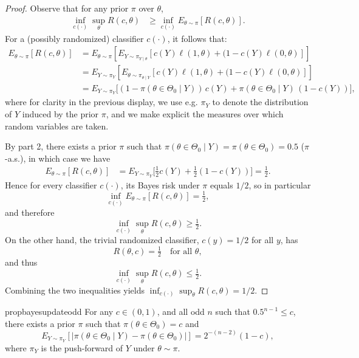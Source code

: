\documentclass[12pt,reqno]{amsart}
\begin{document}
\trivialclassification*
\begin{proof}
Observe that for any prior $\pi$ over $\theta$,
\begin{align*}
 \inf_{c(\cdot)} \sup_{\theta} R(c,\theta)
 &\geq \inf_{c(\cdot)} E_{\theta \sim \pi}[ R(c,\theta)] .
\end{align*}
For a (possibly randomized) classifier $c(\cdot)$, it follows that:
\begin{align*}
E_{\theta \sim \pi}[R(c,\theta)] & = E_{\theta \sim \pi}[ E_{Y \sim \pi_{Y \mid \theta}}[c(Y)\ell(1,\theta) + (1-c(Y) \ell(0,\theta)] ] \\
&= E_{Y \sim \pi_Y}[ E_{\theta \sim \pi_{\theta \mid Y}}[c(Y)\ell(1,\theta) + (1-c(Y) \ell(0,\theta)] ] \\
&= E_{Y \sim \pi_Y}\Big[
(1-\pi(\theta \in \Theta_0\mid Y))\,c(Y) + \pi(\theta \in \Theta_0\mid Y)\,(1-c(Y))
\Big],
\end{align*}
where for clarity in the previous display, we use e.g. $\pi_Y$ to denote the distribution of $Y$ induced by the prior $\pi$, and we make explicit the measures over which random variables are taken. 

By  part 2, there exists a prior $\pi$ such that
$\pi(\theta \in \Theta_0 \mid Y) = \pi(\theta \in \Theta_0) = 0.5$ ($\pi$-a.s.), in which case we have
\begin{align*}
E_{\theta\sim\pi}[R(c,\theta)]
&= E_{Y \sim \pi_Y}\Big[ \tfrac12 c(Y) + \tfrac12 (1-c(Y))\Big]
= \tfrac12 .
\end{align*}
Hence for every classifier $c(\cdot)$, its Bayes risk under $\pi$ equals $1/2$, so in particular
\[
\inf_{c(\cdot)} E_{\theta\sim\pi}[R(c,\theta)] = \tfrac12,
\]
and therefore
\[
\inf_{c(\cdot)} \sup_{\theta} R(c,\theta) \ge \tfrac12.
\]
On the other hand, the trivial randomized classifier, $c(y)= 1/2$ for all $y$, has
\[
R(\theta,c)=\tfrac12 \quad \text{for all }\theta,
\]
and thus
\[
\inf_{c(\cdot)} \sup_{\theta} R(c,\theta) \le \tfrac12.
\]
Combining the two inequalities yields $\inf_{c(\cdot)} \sup_{\theta} R(c,\theta) = 1/2$.
\end{proof}



\begin{restatable}{prop}{bayesupdateodd}
\label{prop:bayesupdateodd}
For any $c \in (0,1)$, and all odd $n$ such that $0.5^{n-1} \leq c$, there exists a prior $\pi$ such that $\pi(\theta \in
\Theta_0) = c$ and
\[ E_{Y \sim \pi_Y}\left[ \left| \pi(\theta \in \Theta_0 \mid Y) - \pi(\theta \in \Theta_0)   \right| \right] = 2^{-(n-2)} (1-c) , \]
where $\pi_Y$ is the push-forward of $Y$ under $\theta \sim \pi$.
\end{restatable}
\end{document}
